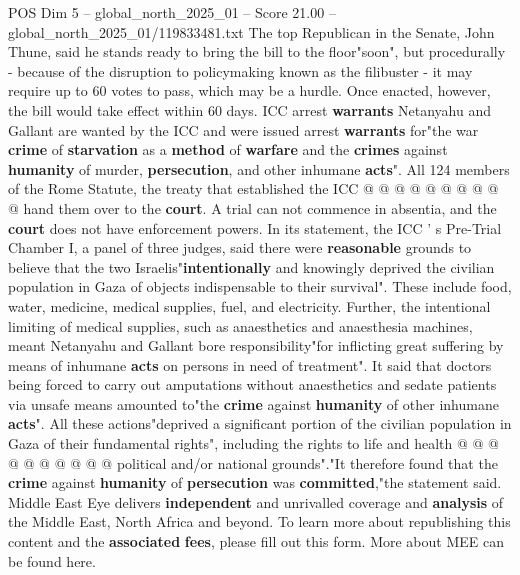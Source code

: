 \begin{textsample}{POS Dim 5 – global\_north\_2025\_01 – Score 21.00 – global\_north\_2025\_01/119833481.txt}
The top Republican in the Senate, John Thune, said he stands ready to bring the bill to the floor"soon", but procedurally - because of the disruption to policymaking known as the filibuster - it may require up to 60 votes to pass, which may be a hurdle.
Once enacted, however, the bill would take effect within 60 days.
ICC arrest \textbf{warrants} Netanyahu and Gallant are wanted by the ICC and were issued arrest \textbf{warrants} for"the war \textbf{crime} of \textbf{starvation} as a \textbf{method} of \textbf{warfare} and the \textbf{crimes} against \textbf{humanity} of murder, \textbf{persecution}, and other inhumane \textbf{acts}".
All 124 members of the Rome Statute, the treaty that established the ICC @ @ @ @ @ @ @ @ @ @ hand them over to the \textbf{court}.
A trial can not commence in absentia, and the \textbf{court} does not have enforcement powers.
In its statement, the ICC ' s Pre-Trial Chamber I, a panel of three judges, said there were \textbf{reasonable} grounds to believe that the two Israelis"\textbf{intentionally} and knowingly deprived the civilian population in Gaza of objects indispensable to their survival".
These include food, water, medicine, medical supplies, fuel, and electricity.
Further, the intentional limiting of medical supplies, such as anaesthetics and anaesthesia machines, meant Netanyahu and Gallant bore responsibility"for inflicting great suffering by means of inhumane \textbf{acts} on persons in need of treatment".
It said that doctors being forced to carry out amputations without anaesthetics and sedate patients via unsafe means amounted to"the \textbf{crime} against \textbf{humanity} of other inhumane \textbf{acts}".
All these actions"deprived a significant portion of the civilian population in Gaza of their fundamental rights", including the rights to life and health @ @ @ @ @ @ @ @ @ @ political and/or national grounds"."It therefore found that the \textbf{crime} against \textbf{humanity} of \textbf{persecution} was \textbf{committed},"the statement said.
Middle East Eye delivers \textbf{independent} and unrivalled coverage and \textbf{analysis} of the Middle East, North Africa and beyond.
To learn more about republishing this content and the \textbf{associated} \textbf{fees}, please fill out this form.
More about MEE can be found here.

\end{textsample}
